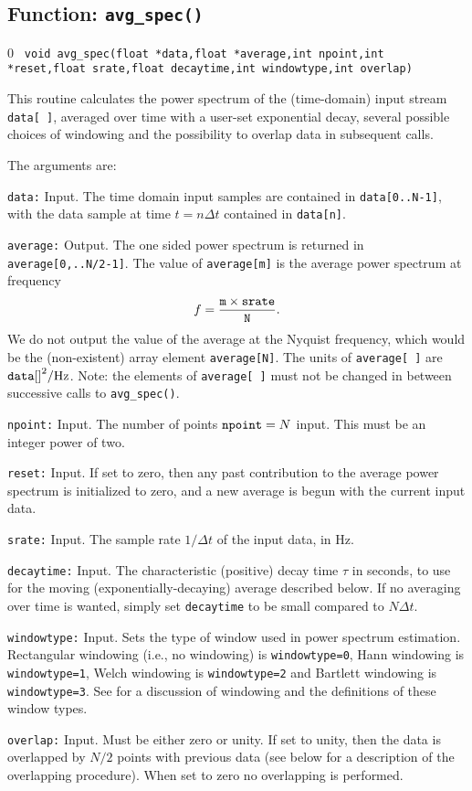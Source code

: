 \subsection{Function: {\tt avg\_spec() }}
\setcounter{equation}0
{\tt 
void avg\_spec(float *data,float *average,int npoint,int *reset,float srate,float decaytime,int windowtype,int overlap)}

This routine calculates the power spectrum of the (time-domain) input
stream {\tt data[ ]}, averaged over time with a user-set exponential
decay, several possible choices of windowing and the possibility to
overlap data in subsequent calls.

The arguments are:
\begin{description}
\item{\tt data:} Input.  The time domain input samples are contained in
{\tt data[0..N-1]}, with the data sample at time $t= n \Delta t$
contained in {\tt data[n]}.
\item{\tt average:} Output.  The one sided power spectrum is returned in
{\tt average[0,..N/2-1]}.  The value of {\tt average[m]} is the
average power spectrum at frequency
\begin{equation}
f={{\tt m} \times {\tt srate} \over {\tt N}}.
\end{equation}
We do not output the value of the average at the Nyquist frequency,
which would be the (non-existent) array element {\tt average[N]}.  The
units of {\tt average[ ]} are ${\tt data[ ]}^2/{\rm Hz}$.  Note: the
elements of {\tt average[ ]} must not be changed in between successive
calls to {\tt avg\_spec()}.
\item{\tt npoint:} Input.  The number of points ${\tt npoint}=N$
input.  This must be an integer power of two.
\item{\tt reset:} Input.  If set to zero, then any past contribution to
the average power spectrum is initialized to zero, and a new average is
begun with the current input data.
\item{\tt srate:} Input.  The sample rate $1/\Delta t$ of the input
data, in Hz.
\item{\tt decaytime:} Input.  The characteristic (positive) decay time
 $\tau$ in seconds, to use for the moving (exponentially-decaying)
 average described below.  If no averaging over time is wanted, simply
 set {\tt decaytime} to be small compared to $N \Delta t$.
\item{\tt windowtype:} Input.  Sets the type of window used in power
spectrum estimation.  Rectangular windowing (i.e., no windowing) is
{\tt windowtype=0}, Hann windowing is  {\tt windowtype=1}, Welch
windowing is {\tt windowtype=2} and Bartlett windowing is {\tt
windowtype=3}.  See \cite{NumRec} for a discussion of windowing and the
definitions of these window types.
\item{\tt overlap:} Input.  Must be either zero or unity.  If set to
unity, then the data is overlapped by $N/2$ points with previous data
(see below for a description of the overlapping procedure).   When set
to zero no overlapping is performed.
\end{description}

